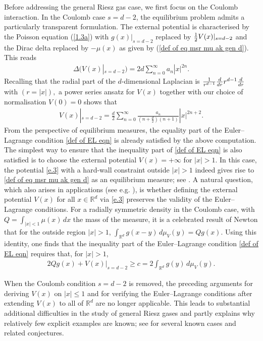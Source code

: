 \documentclass[10pt]{amsart}
\theoremstyle{plain}
\theoremstyle{remark}
\numberwithin{equation}{section}
\begin{document}
Before addressing the general Riesz gas case, we first focus on the Coulomb interaction. In the Coulomb case $s=d-2$, the equilibrium problem admits a particularly transparent formulation. 
The external potential is characterised by the Poisson equation
(\ref{1.3a}) with $g(x) |_{s=d-2}$ replaced by ${1 \over 2} V(x) |_{s=d-2} $ and
the Dirac delta replaced by $-\mu(x)$ as given by (\ref{def of eq msr mu ak gen d}). This reads
\begin{align}\label{e.2}
\Delta \Big( V(x)|_{s=d-2}\Big) = 2d \sum_{n=0}^\infty a_n |x|^{2n}.  
\end{align}
Recalling that the radial part of the $d$-dimensional Laplacian is
${1 \over r^{d-1}}{d \over dr} r^{d-1} {d \over dr}$ with $(r = |x|),$ 
a power series ansatz for $V(x)$ together with our choice of normalisation $V(0) = 0$ shows that
\begin{align}\label{e.3}
   V(x)|_{s=d-2}= \frac{d}{2} \sum_{n=0}^\infty \frac{a_n}{(n+\frac{d}{2})(n+1)} |x|^{2n+2}. 
\end{align}  
From the perspective of equilibrium measures, the equality part of the 
Euler--Lagrange condition \eqref{def of EL eqn} is already satisfied by the above computation. 
The simplest way to ensure that the inequality part of \eqref{def of EL eqn} is also satisfied is to choose the external potential $V(x)=+\infty$ for $|x|>1$. 
In this case, the potential \eqref{e.3} with a hard-wall constraint outside 
$|x|>1$ indeed gives rise to \eqref{def of eq msr mu ak gen d} as an equilibrium measure; see \cite{CFLV17}.
A natural question, which also arises in applications (see e.g.  \cite{ST97}), is whether defining the external potential $V(x)$ for all 
$x\in\mathbb{R}^d$ via \eqref{e.3} preserves the validity of the 
Euler--Lagrange conditions.
For a radially symmetric density in the Coulomb case, with $Q = \int_{|x| < 1} \mu(x) \, dx$ the mass of the measure, it is a celebrated result of Newton that for the outside region $|x| > 1$, $\int_{\mathbb R^d} g(x-y) \, d \mu_V(y) = Q g(x)$. Using this identity, one finds that the inequality part of the Euler--Lagrange condition \eqref{def of EL eqn} requires that, for $|x|>1$,
\begin{align}\label{e.4}
2 Q g(x) + V(x)|_{s = d - 2} \ge c = 2 \int_{\mathbb R^d} g(y) \, d \mu_V(y) .
\end{align} 

When the Coulomb condition $s=d-2$ is removed, the preceding arguments for 
deriving $V(x)$ on $|x|\le 1$ and for verifying the Euler--Lagrange conditions 
after extending $V(x)$ to all of $\mathbb{R}^d$ are no longer applicable. 
This leads to substantial additional difficulties in the study of general Riesz gases and partly explains why relatively few explicit examples are known; see \cite[Section~2]{CSW23} for several known cases and related 
conjectures.
\end{document}
